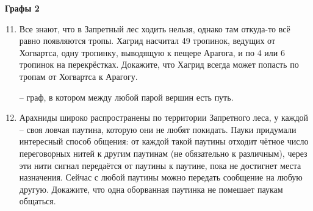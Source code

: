 \centerline{\bf \large Графы 2}
\begin{enumerate}
\setcounter{enumi}{10}
 -- это последовательность вершин $v_1, v_2, \ldots, v_n$, таких, что между двумя
соседними вершинами на пути есть ребро (в случае ориентированного графа -- ребро в нужную сторону).
Путь называется {\it вершинно-простым}, если все вершины на пути различны, кроме, возможно, $v_1$ и
$v_n$. Путь называется {\it рёберно-простым}, если все рёбра на пути различны.
Путь называется {\it циклом}, если первая и последняя вершины на пути совпадают. Путь называется
{\it простым циклом}, если он цикл и он рёберно-простой.
\item Все знают, что в Запретный лес ходить нельзя, однако там откуда-то всё равно появляются
тропы. Хагрид насчитал 49 тропинок, ведущих от Хогвартса, одну тропинку, выводящую к пещере Арагога,
и по 4 или 6 тропинок на перекрёстках. Докажите, что Хагрид всегда может попасть по тропам от
Хогвартса к Арагогу.

 -- граф, в котором между любой парой вершин есть путь.
\item Арахниды широко распространены по территории Запретного леса, у каждой – своя ловчая паутина,
которую они не любят покидать. Пауки придумали интересный способ общения: от каждой такой паутины
отходит чётное число переговорных нитей к другим паутинам (не обязательно к различным), через эти
нити сигнал передаётся от паутины к паутине, пока не достигнет места назначения. Сейчас с любой
паутины можно передать сообщение на любую другую. Докажите, что одна оборванная паутинка не помешает
паукам общаться.


\end{enumerate}
